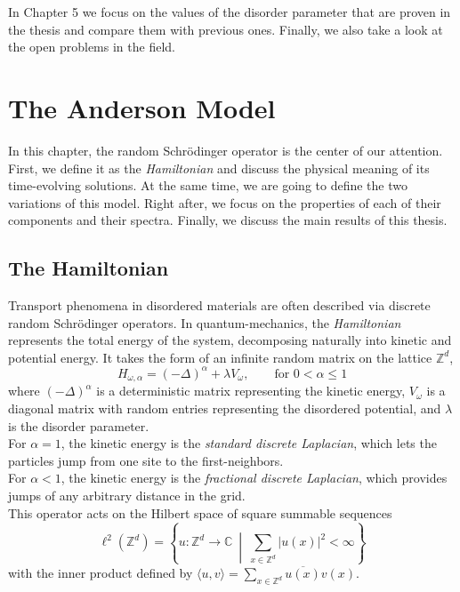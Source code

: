 \documentclass[11pt, a4paper, UKenglish, oneside]{book}
\theoremstyle{plain}
\theoremstyle{remark}
\theoremstyle{definition}
\numberwithin{equation}{section}
\numberwithin{theorem}{section}
\begin{document}
\noindent
In Chapter 5 we focus on the values of the disorder parameter that are proven in the thesis and compare them with previous ones. Finally, we also take a look at the open problems in the field.

\clearpage
\chapter{The Anderson Model}
In this chapter, the random Schr\"odinger operator is the center of our attention. First, we define it as the \textit{Hamiltonian} and discuss the physical meaning of its time-evolving solutions. At the same time, we are going to define the two variations of this model. Right after, we focus on the properties of each of their components and their spectra. Finally, we discuss the main results of this thesis.\\
\section{The Hamiltonian}
\label{sec:The_Hamiltonian}
Transport phenomena in disordered materials are often described via discrete random Schr\"odinger operators. In quantum-mechanics, the \textit{Hamiltonian} represents the total energy of the system, decomposing naturally into kinetic and potential energy. It takes the form of an infinite random matrix on the lattice $\mathbb{Z}^d$, 
\begin{equation}
    H_{\omega,\alpha} = (- \Delta)^\alpha + \lambda V_\omega, \qquad \text{for } 0<\alpha\le 1
\end{equation}
where $(-\Delta)^{\alpha}$ is a deterministic matrix representing the kinetic energy, $V_\omega$ is a diagonal matrix with random entries representing the disordered potential, and $\lambda$ is the disorder parameter.\\
For $\alpha=1$, the kinetic energy is the \textit{standard discrete Laplacian}, which lets the particles jump from one site to the first-neighbors.\\
For $\alpha <1$, the kinetic energy is the \textit{fractional discrete Laplacian}, which provides jumps of any arbitrary distance in the grid.\\
This operator acts on the Hilbert space of square summable sequences
\[
\ell^2(\mathbb{Z}^d) = \left\{ u : \mathbb{Z}^d \to \mathbb{C} \ \middle| \ \sum_{x \in \mathbb{Z}^d} |u(x)|^2 < \infty \right\}
\]
with the inner product defined by $\langle u, v \rangle = \sum_{x \in \mathbb{Z}^d} \overline{u(x)} v(x)$.\\
\end{document}
